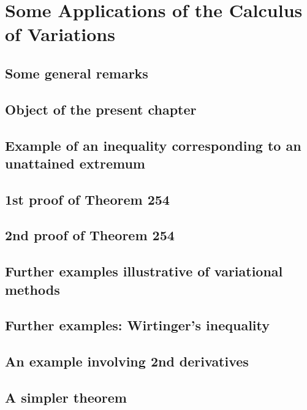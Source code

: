\documentclass[oneside]{book}
\numberwithin{equation}{section}
\begin{document}

\section{Some Applications of the Calculus of Variations}

\subsection{Some general remarks}

\subsection{Object of the present chapter}

\subsection{Example of an inequality corresponding to an unattained extremum}

\subsection{1st proof of Theorem 254}

\subsection{2nd proof of Theorem 254}

\subsection{Further examples illustrative of variational methods}

\subsection{Further examples: Wirtinger's inequality}

\subsection{An example involving 2nd derivatives}

\subsection{A simpler theorem}
\end{document}
